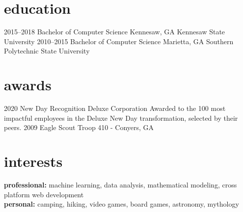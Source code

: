 \documentclass[]{friggeri-cv} %
\begin{document}

\section{education}

\begin{entrylist}


\entry
{2015--2018}
{Bachelor {\normalfont of Computer Science}}
{Kennesaw, GA}
{Kennesaw State University}
\entry
{2010--2015}
{Bachelor {\normalfont of Computer Science}}
{Marietta, GA}
{Southern Polytechnic State University}

\end{entrylist}


\section{awards}

\begin{entrylist}


\entry
{2020}
{New Day Recognition}
{Deluxe Corporation}
{Awarded to the 100 most impactful employees in the Deluxe New Day transformation, selected by their peers.}
\entry
{2009}
{Eagle Scout}
{Troop 410 - Conyers, GA}
{}

\end{entrylist}



\section{interests}

\textbf{professional:} machine learning, data analysis, mathematical modeling, cross platform web development   \\
\textbf{personal:} camping, hiking, video games, board games, astronomy, mythology
\end{document}
